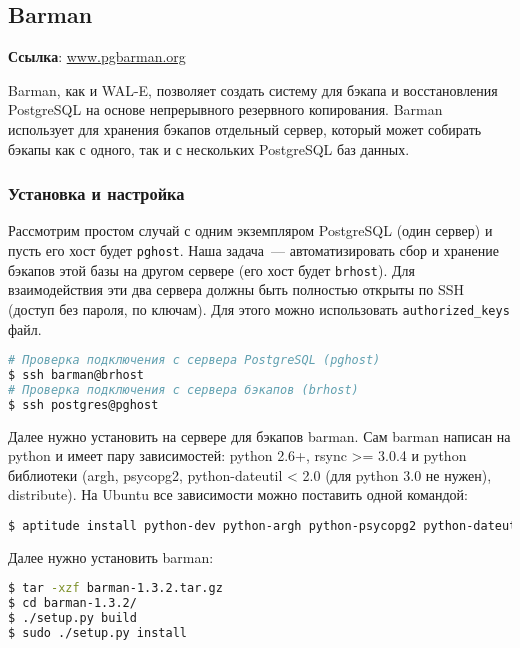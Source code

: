 \subsection{Barman}
\textbf{Ссылка}: \href{http://www.pgbarman.org/}{www.pgbarman.org}

Barman, как и WAL-E, позволяет создать систему для бэкапа и восстановления PostgreSQL на основе непрерывного резервного копирования. Barman использует для хранения бэкапов отдельный сервер, который может собирать бэкапы как с одного, так и с нескольких PostgreSQL баз данных.

\subsubsection{Установка и настройка}

Рассмотрим простом случай с одним экземпляром PostgreSQL (один сервер) и пусть его хост будет \lstinline!pghost!. Наша задача~--- автоматизировать сбор и хранение бэкапов этой базы на другом сервере (его хост будет \lstinline!brhost!). Для взаимодействия эти два сервера должны быть полностью открыты по SSH (доступ без пароля, по ключам). Для этого можно использовать \lstinline!authorized_keys! файл.

\begin{lstlisting}[language=Bash,label=lst:barman1,caption=Проверка подключения по SSH]
# Проверка подключения с сервера PostgreSQL (pghost)
$ ssh barman@brhost
# Проверка подключения с сервера бэкапов (brhost)
$ ssh postgres@pghost
\end{lstlisting}

Далее нужно установить на сервере для бэкапов barman. Сам barman написан на python и имеет пару зависимостей: python 2.6+, rsync >= 3.0.4 и python библиотеки (argh, psycopg2, python-dateutil < 2.0 (для python 3.0 не нужен), distribute). На Ubuntu все зависимости можно поставить одной командой:

\begin{lstlisting}[language=Bash,label=lst:barman2,caption=Установка зависимостей barman]
$ aptitude install python-dev python-argh python-psycopg2 python-dateutil rsync python-setuptools
\end{lstlisting}

Далее нужно установить barman:

\begin{lstlisting}[language=Bash,label=lst:barman3,caption=Установка barman]
$ tar -xzf barman-1.3.2.tar.gz
$ cd barman-1.3.2/
$ ./setup.py build
$ sudo ./setup.py install
\end{lstlisting}

